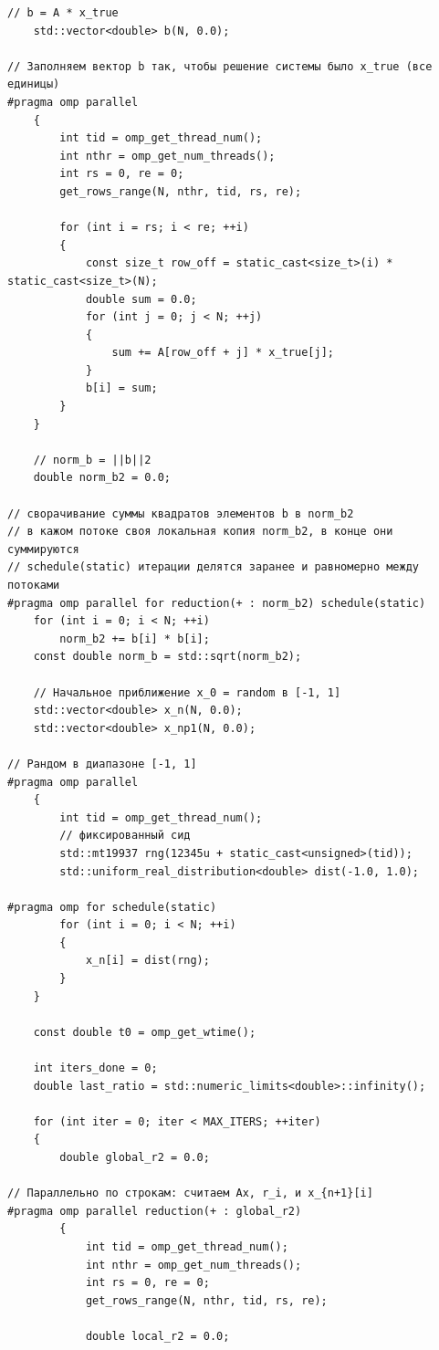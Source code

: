 \documentclass[a4paper, 14pt]{extarticle}
\begin{document}
\begin{lstlisting}[caption={Исходный код программы}, label={lst:source_code}]
    // b = A * x_true
    std::vector<double> b(N, 0.0);

// Заполняем вектор b так, чтобы решение системы было x_true (все единицы)
#pragma omp parallel
    {
        int tid = omp_get_thread_num();
        int nthr = omp_get_num_threads();
        int rs = 0, re = 0;
        get_rows_range(N, nthr, tid, rs, re);

        for (int i = rs; i < re; ++i)
        {
            const size_t row_off = static_cast<size_t>(i) * static_cast<size_t>(N);
            double sum = 0.0;
            for (int j = 0; j < N; ++j)
            {
                sum += A[row_off + j] * x_true[j];
            }
            b[i] = sum;
        }
    }

    // norm_b = ||b||2
    double norm_b2 = 0.0;

// сворачивание суммы квадратов элементов b в norm_b2
// в кажом потоке своя локальная копия norm_b2, в конце они суммируются
// schedule(static) итерации делятся заранее и равномерно между потоками
#pragma omp parallel for reduction(+ : norm_b2) schedule(static)
    for (int i = 0; i < N; ++i)
        norm_b2 += b[i] * b[i];
    const double norm_b = std::sqrt(norm_b2);

    // Начальное приближение x_0 = random в [-1, 1]
    std::vector<double> x_n(N, 0.0);
    std::vector<double> x_np1(N, 0.0);

// Рандом в диапазоне [-1, 1]
#pragma omp parallel
    {
        int tid = omp_get_thread_num();
        // фиксированный сид
        std::mt19937 rng(12345u + static_cast<unsigned>(tid));
        std::uniform_real_distribution<double> dist(-1.0, 1.0);

#pragma omp for schedule(static)
        for (int i = 0; i < N; ++i)
        {
            x_n[i] = dist(rng);
        }
    }

    const double t0 = omp_get_wtime();

    int iters_done = 0;
    double last_ratio = std::numeric_limits<double>::infinity();

    for (int iter = 0; iter < MAX_ITERS; ++iter)
    {
        double global_r2 = 0.0;

// Параллельно по строкам: считаем Ax, r_i, и x_{n+1}[i]
#pragma omp parallel reduction(+ : global_r2)
        {
            int tid = omp_get_thread_num();
            int nthr = omp_get_num_threads();
            int rs = 0, re = 0;
            get_rows_range(N, nthr, tid, rs, re);

            double local_r2 = 0.0;


\end{lstlisting}
\end{document}
